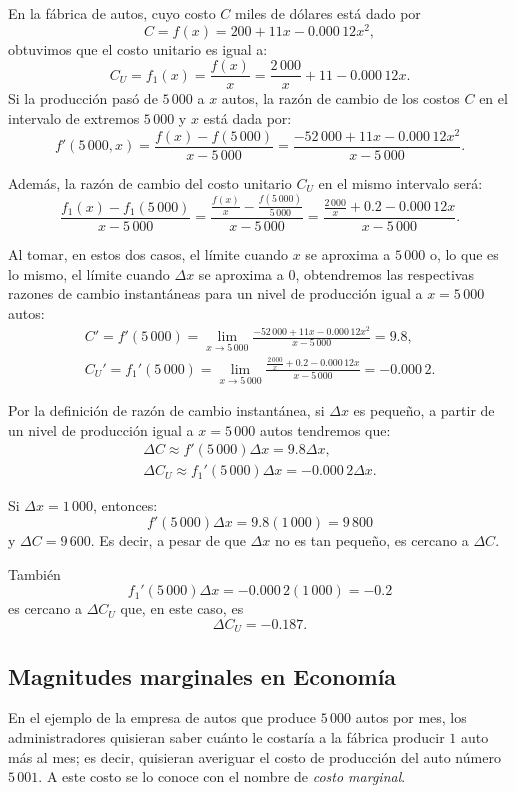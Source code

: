 \begin{exemplo}[]{}
En la fábrica de autos, cuyo costo $C$ miles de dólares está dado por
\[
C = f(x) = 200 + 11x - 0.000\,12 x^2,
\]
obtuvimos que el costo unitario es igual a:
\[
C_U = f_1(x) = \frac{f(x)}{x}= \frac{2\,000}{x}+11-0.000\,12x.
\]
Si la producción pasó de $5\,000$ a $x$ autos, la razón de cambio de los costos $C$ en el intervalo
de extremos $5\,000$ y $x$ está dada por:
\[
f'(5\,000,x)=\frac{f(x)-f(5\,000)}{x-5\,000}=\frac{-52\,000+11x-0.000\,12x^2}{x-5\,000}.
\]

Además, la razón de cambio del costo unitario $C_U$ en el mismo intervalo será:
\[
\frac{f_1(x)-f_1(5\,000)}{x-5\,000}=\frac{\frac{f(x)}{x}-\frac{f(5\,000)}{5\,000}}{x-5\,000}%
=\frac{\frac{2\,000}{x}+0.2-0.000\,12x}{x-5\,000}.
\]

Al tomar, en estos dos casos, el límite cuando $x$ se aproxima a $5\,000$ o, lo que es lo mismo, el
límite cuando $\Delta x$ se aproxima a $0$, obtendremos las respectivas razones de cambio
instantáneas para un nivel de producción igual a $x=5\,000$ autos:
\begin{gather*}
C'=f'(5\,000)=\lim_{x\to 5\,000}\frac{-52\,000+11x-0.000\,12x^2}{x-5\,000}=9.8,\\
C_U'=f_1'(5\,000)=\lim_{x\to 5\,000}\frac{\frac{2\,000}{x}+0.2-0.000\,12x}{x-5\,000}=-0.000\,2.
\end{gather*}

Por la definición de razón de cambio instantánea, si $\Delta x$ es pequeño, a partir de un nivel de
producción igual a $x=5\,000$ autos tendremos que:
\begin{gather*}
\Delta C\approx f'(5\,000)\Delta x  =9.8\Delta x,\\
\Delta C_U\approx f_1'(5\,000)\Delta x   = -0.000\,2\Delta x.
\end{gather*}

Si $\Delta x = 1\,000$, entonces:
\[
f'(5\,000)\Delta x  =9.8(1\,000)=9\,800
\]
y $\Delta C = 9\,600$. Es decir, a pesar de que $\Delta x$ no es tan pequeño, es cercano a $\Delta
C$.

También
\[
f_1'(5\,000)\Delta x  =-0.000\,2(1\,000)=-0.2
\]
es cercano a $\Delta C_U$ que, en este caso, es
\[
\Delta C_U  =-0.187.
\]
\end{exemplo}

\subsection{Magnitudes marginales en Economía}
En el ejemplo de la empresa de autos que produce $5\,000$ autos por mes, los administradores
quisieran saber cuánto le costaría a la fábrica producir $1$ auto más al mes; es decir, quisieran
averiguar el costo de producción del auto número $5\,001$. A este costo se lo conoce con el nombre
de \emph{costo marginal}.

